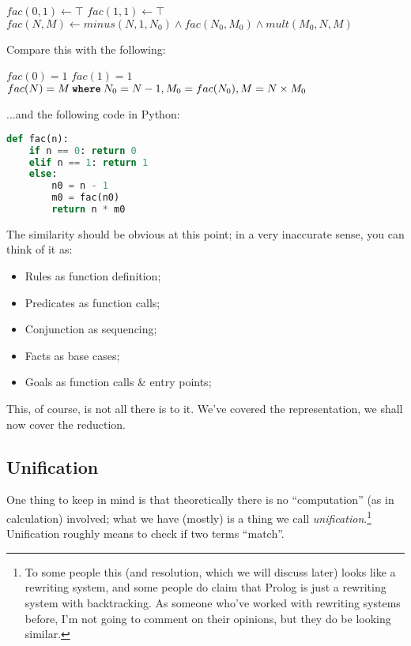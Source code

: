 \begin{algorithm}
\begin{algorithmic}
  \State $fac(0,1) \gets \top$
  \State $fac(1,1) \gets \top$
  \State $fac(N,M) \gets minus(N,1,N_0) \wedge fac(N_0, M_0) \wedge mult(M_0,N,M)$
\end{algorithmic}
\end{algorithm}

Compare this with the following:

\begin{algorithm}
\begin{algorithmic}
  \State $fac(0) = 1$
  \State $fac(1) = 1$
  \State $fac(N) = M\: \textbf{\texttt{where}}\: N_0 = N-1, M_0 = fac(N_0), M=N\times M_0 $
\end{algorithmic}
\end{algorithm}

...and the following code in Python:

\begin{lstlisting}[language=Python]
def fac(n):
    if n == 0: return 0
    elif n == 1: return 1
    else:
        n0 = n - 1
        m0 = fac(n0)
        return n * m0
\end{lstlisting}

The similarity should be obvious at this point; in a very inaccurate sense, you can think of it as:

\begin{itemize}
	\item Rules as function definition;
	\item Predicates as function calls;
	\item Conjunction as sequencing;
	\item Facts as base cases;
	\item Goals as function calls \& entry points;
\end{itemize}

This, of course, is not all there is to it. We've covered the representation, we shall now cover the reduction.
\subsection{Unification}
\label{sec:org852f8b2}

One thing to keep in mind is that theoretically there is no ``computation'' (as in calculation) involved; what we have (mostly) is a thing we call \textit{unification}.\footnote{To some people this (and resolution, which we will discuss later) looks like a rewriting system, and some people do claim that Prolog is just a rewriting system with backtracking. As someone who've worked with rewriting systems before, I'm not going to comment on their opinions, but they do be looking similar.} Unification roughly means to check if two terms ``match''.

